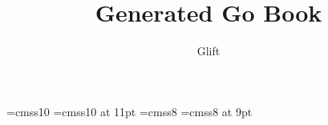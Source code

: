\documentclass[a5paper]{article}
\begin{document}
\title{Generated Go Book}
\author{Glift}
\maketitle
\font\tenpoint=cmss10
\font\tenpointeleven=cmss10 at 11pt
\font\eightpoint=cmss8
\font\eightpointnine=cmss8 at 9pt
\newdimen\bigRaise
\bigRaise=4.3pt
\newdimen\smallRaise
\smallRaise=3.5pt
\newdimen\inlineRaise
\inlineRaise=3.5pt
\def\eLbl#1{\leavevmode\hbox to \goIntWd{\hss\raise\smallRaise\hbox{\rm \tenpoint{#1}}\hss}}
\def\goWsLbl#1{\leavevmode\setbox0=\hbox{\0??!}\rlap{\0??!}\raise\smallRaise\hbox to \wd0{\hss\eightpointnine{#1}\hss}}
\def\goBsLbl#1{\leavevmode\setbox0=\hbox{\0??@}\rlap{\0??@}\raise\smallRaise\hbox to \wd0{\hss\color{white}\eightpointnine{#1}\color{white}\hss}}

\newpage
\end{document}
